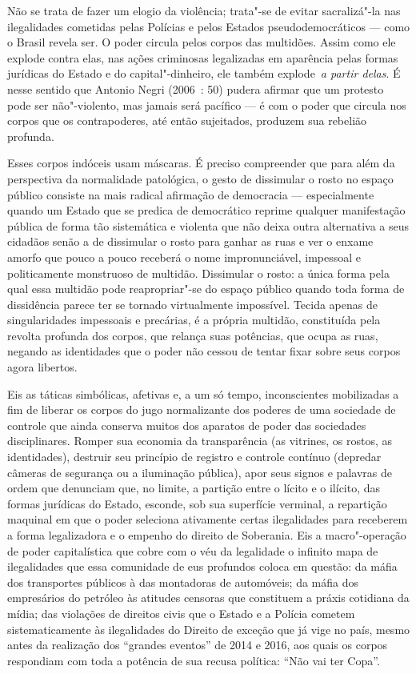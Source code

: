 Não se trata de fazer um elogio da violência; trata"-se de evitar
sacralizá"-la nas ilegalidades cometidas pelas Polícias e pelos Estados
pseudodemocráticos --- como o Brasil revela ser. O poder circula pelos
corpos das multidões. Assim como ele explode contra elas, nas ações
criminosas legalizadas em aparência pelas formas jurídicas do Estado e
do capital"-dinheiro, ele também explode~\emph{a partir delas}. É nesse
sentido que Antonio Negri (2006~: 50) pudera afirmar que um protesto
pode ser não"-violento, mas jamais será pacífico --- é com o poder que
circula nos corpos que os contrapoderes, até então sujeitados, produzem
sua rebelião profunda.

Esses corpos indóceis usam máscaras. É preciso compreender que para além
da perspectiva da normalidade patológica, o gesto de dissimular o rosto
no espaço público consiste na mais radical afirmação de democracia ---
especialmente quando um Estado que se predica de democrático reprime
qualquer manifestação pública de forma tão sistemática e violenta que
não deixa outra alternativa a seus cidadãos senão a de dissimular o
rosto para ganhar as ruas e ver o enxame amorfo que pouco a pouco
receberá o nome impronunciável, impessoal e politicamente monstruoso de
multidão. Dissimular o rosto: a única forma pela qual essa multidão pode
reapropriar"-se do espaço público quando toda forma de dissidência parece
ter se tornado virtualmente impossível. Tecida apenas de singularidades
impessoais e precárias, é a própria multidão, constituída pela revolta
profunda dos corpos, que relança suas potências, que ocupa as ruas,
negando as identidades que o poder não cessou de tentar fixar sobre seus
corpos agora libertos.

Eis as táticas simbólicas, afetivas e, a um só tempo, inconscientes
mobilizadas a fim de liberar os corpos do jugo normalizante dos poderes
de uma sociedade de controle que ainda conserva muitos dos aparatos de
poder das sociedades disciplinares. Romper sua economia da transparência
(as vitrines, os rostos, as identidades), destruir seu princípio de
registro e controle contínuo (depredar câmeras de segurança ou a
iluminação pública), apor seus signos e palavras de ordem que denunciam
que, no limite, a partição entre o lícito e o ilícito, das formas
jurídicas do Estado, esconde, sob sua superfície verminal, a repartição
maquinal em que o poder seleciona ativamente certas ilegalidades para
receberem a forma legalizadora e o empenho do direito de Soberania. Eis
a macro"-operação de poder capitalística que cobre com o véu da
legalidade o infinito mapa de ilegalidades que essa comunidade de eus
profundos coloca em questão: da máfia dos transportes públicos à das
montadoras de automóveis; da máfia dos empresários do petróleo às
atitudes censoras que constituem a práxis cotidiana da mídia; das
violações de direitos civis que o Estado e a Polícia cometem
sistematicamente às ilegalidades do Direito de exceção que
já vige no país, mesmo antes da realização dos ``grandes eventos'' de
2014 e 2016, aos quais os corpos respondiam com toda a potência de sua
recusa política: ``Não vai ter Copa''.

